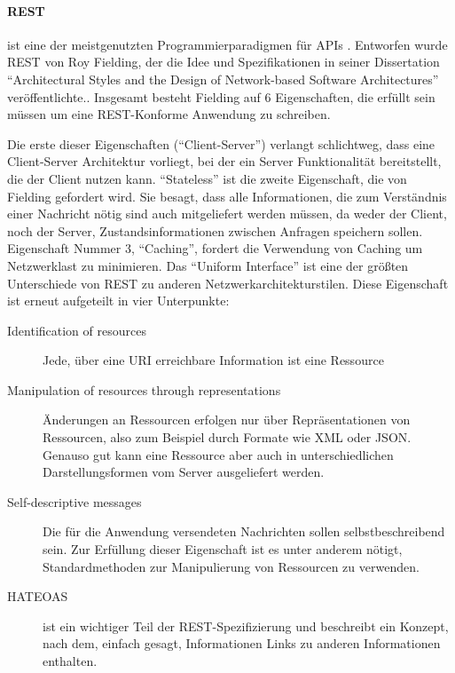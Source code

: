 \documentclass[12pt,a4paper,bibliography=totocnumbered,listof=totocnumbered]{scrartcl}
\begin{document}
\paragraph{\acf{REST}} ist eine der meistgenutzten Programmierparadigmen für \ac{API}s \cite{duvander}. Entworfen wurde \ac{REST} von Roy Fielding, der die Idee und Spezifikationen in seiner Dissertation \enquote{Architectural Styles and the Design of Network-based Software Architectures} veröffentlichte.\cite{fielding}. Insgesamt besteht Fielding auf 6 Eigenschaften, die erfüllt sein müssen um eine REST-Konforme Anwendung zu schreiben.

Die erste dieser Eigenschaften (\enquote{Client-Server}) verlangt schlichtweg, dass eine Client-Server Architektur vorliegt, bei der ein Server Funktionalität bereitstellt, die der Client nutzen kann.
\enquote{Stateless} ist die zweite Eigenschaft, die von Fielding gefordert wird. Sie besagt, dass alle Informationen, die zum Verständnis einer Nachricht nötig sind auch mitgeliefert werden müssen, da weder der Client, noch der Server, Zustandsinformationen zwischen Anfragen speichern sollen.
Eigenschaft Nummer 3, \enquote{Caching}, fordert die Verwendung von Caching um Netzwerklast zu minimieren.
Das \enquote{Uniform Interface} ist eine der größten Unterschiede von REST zu anderen Netzwerkarchitekturstilen. Diese Eigenschaft ist erneut aufgeteilt in vier Unterpunkte:

\begin{description}  
	\item [Identification of resources] Jede, über eine URI erreichbare Information ist eine Ressource
	\item [Manipulation of resources through representations] Änderungen an Ressourcen erfolgen nur über Repräsentationen von Ressourcen, also zum Beispiel durch Formate wie XML oder JSON. Genauso gut kann eine Ressource aber auch in unterschiedlichen Darstellungsformen vom Server ausgeliefert werden.
	\item [Self-descriptive messages] Die für die Anwendung versendeten Nachrichten sollen selbstbeschreibend sein. Zur Erfüllung dieser Eigenschaft ist es unter anderem nötigt, Standardmethoden zur Manipulierung von Ressourcen zu verwenden.
	\item [\acf{HATEOAS}] ist ein wichtiger Teil der REST-Spezifizierung und beschreibt ein Konzept, nach dem, einfach gesagt, Informationen Links zu anderen Informationen enthalten. 
\end{description}
\end{document}
